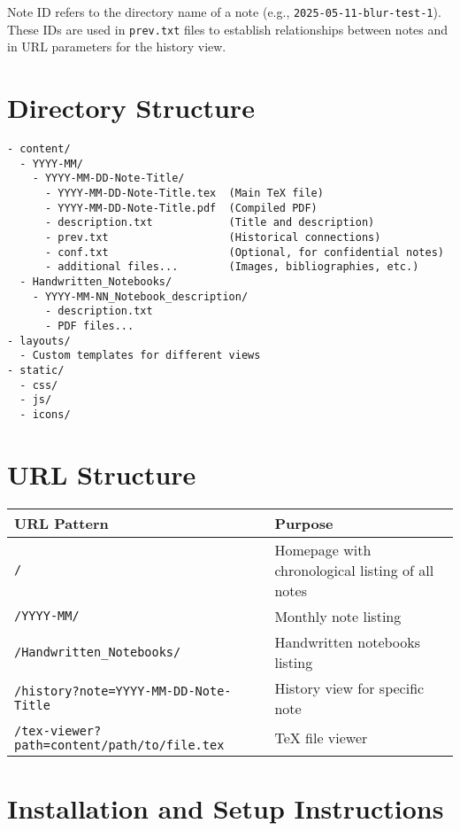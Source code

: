 \documentclass{article}
\begin{document}
Note ID refers to the directory name of a note (e.g., \texttt{2025-05-11-blur-test-1}). These IDs are used in \texttt{prev.txt} files to establish relationships between notes and in URL parameters for the history view.

\section{Directory Structure}

\begin{verbatim}
- content/
  - YYYY-MM/
    - YYYY-MM-DD-Note-Title/
      - YYYY-MM-DD-Note-Title.tex  (Main TeX file)
      - YYYY-MM-DD-Note-Title.pdf  (Compiled PDF)
      - description.txt            (Title and description)
      - prev.txt                   (Historical connections)
      - conf.txt                   (Optional, for confidential notes)
      - additional files...        (Images, bibliographies, etc.)
  - Handwritten_Notebooks/
    - YYYY-MM-NN_Notebook_description/
      - description.txt
      - PDF files...
- layouts/
  - Custom templates for different views
- static/
  - css/
  - js/
  - icons/
\end{verbatim}

\section{URL Structure}

\begin{tabular}{|l|l|}
\hline
\textbf{URL Pattern} & \textbf{Purpose} \\
\hline
\texttt{/} & Homepage with chronological listing of all notes \\
\texttt{/YYYY-MM/} & Monthly note listing \\
\texttt{/Handwritten\_Notebooks/} & Handwritten notebooks listing \\
\texttt{/history?note=YYYY-MM-DD-Note-Title} & History view for specific note \\
\texttt{/tex-viewer?path=content/path/to/file.tex} & TeX file viewer \\
\hline
\end{tabular}

\section{Installation and Setup Instructions}
\end{document}
